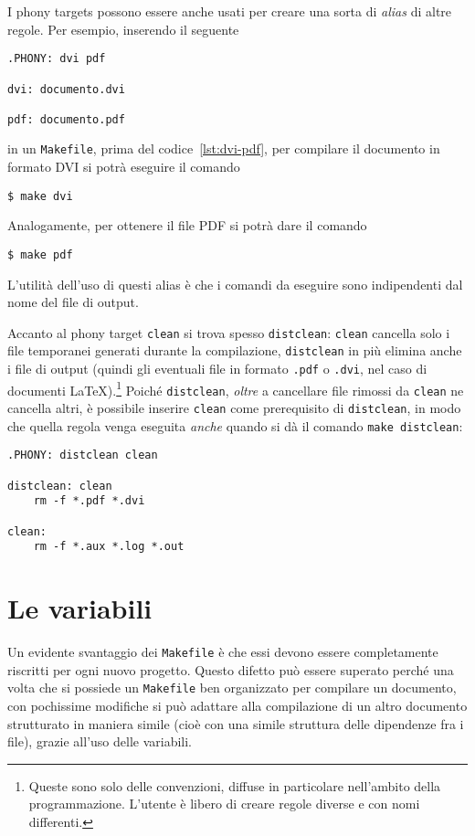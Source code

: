 I phony targets possono essere anche usati per creare una sorta di \emph{alias}
di altre regole.  Per esempio, inserendo il seguente
\begin{lstlisting}[caption={I prerequisiti della regola dell'obiettivo
\texttt{.PHONY} sono i nomi dei phony targets che vengono successivamente
specificati.},label=lst:phony]
.PHONY: dvi pdf

dvi: documento.dvi

pdf: documento.pdf
\end{lstlisting}
in un \texttt{Makefile}, prima del codice~\ref{lst:dvi-pdf}, per compilare il
documento in formato \textsc{DVI} si potrà eseguire il comando
\begin{verbatim}
$ make dvi
\end{verbatim}
Analogamente, per ottenere il file \textsc{PDF} si potrà dare il comando
\begin{verbatim}
$ make pdf
\end{verbatim}
L'utilità dell'uso di questi alias è che i comandi da eseguire sono indipendenti
dal nome del file di output.

Accanto al phony target \texttt{clean} si trova spesso \texttt{distclean}:
\texttt{clean} cancella solo i file temporanei generati durante la compilazione,
\texttt{distclean} in più elimina anche i file di output (quindi gli eventuali
file in formato \texttt{.pdf} o \texttt{.dvi}, nel caso di documenti
\LaTeX).\footnote{Queste sono solo delle convenzioni, diffuse in particolare
  nell'ambito della programmazione.  L'utente è libero di creare regole diverse
  e con nomi differenti.}
Poiché \texttt{distclean}, \emph{oltre} a cancellare file rimossi da
\texttt{clean} ne cancella altri, è possibile inserire \texttt{clean} come
prerequisito di \texttt{distclean}, in modo che quella regola venga eseguita
\emph{anche} quando si dà il comando \texttt{make distclean}:
\begin{lstlisting}[caption={Phony targets \texttt{distclean} e \texttt{clean}.},
label=lst:distclean]
.PHONY: distclean clean

distclean: clean
	rm -f *.pdf *.dvi

clean:
	rm -f *.aux *.log *.out
\end{lstlisting}


\section{Le variabili}
\label{sec:variabili}

Un evidente svantaggio dei \texttt{Makefile} è che essi devono essere
completamente riscritti per ogni nuovo progetto.  Questo difetto può essere
superato perché una volta che si possiede un \texttt{Makefile} ben organizzato
per compilare un documento, con pochissime modifiche si può adattare alla
compilazione di un altro documento strutturato in maniera simile (cioè con una
simile struttura delle dipendenze fra i file), grazie all'uso delle variabili.


